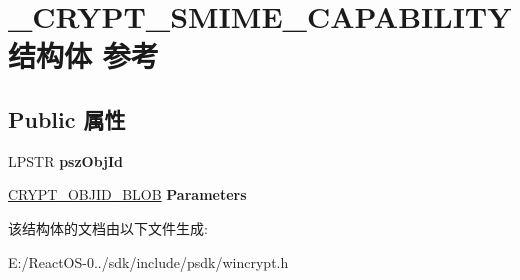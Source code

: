 \hypertarget{struct___c_r_y_p_t___s_m_i_m_e___c_a_p_a_b_i_l_i_t_y}{}\section{\+\_\+\+C\+R\+Y\+P\+T\+\_\+\+S\+M\+I\+M\+E\+\_\+\+C\+A\+P\+A\+B\+I\+L\+I\+T\+Y结构体 参考}
\label{struct___c_r_y_p_t___s_m_i_m_e___c_a_p_a_b_i_l_i_t_y}
\subsection*{Public 属性}
\begin{DoxyCompactItemize}
\item 
\mbox{\label{struct___c_r_y_p_t___s_m_i_m_e___c_a_p_a_b_i_l_i_t_y_a12e669a93b55d6ac4aa81bf216a38460}} 
L\+P\+S\+TR {\bfseries psz\+Obj\+Id}
\item 
\mbox{\label{struct___c_r_y_p_t___s_m_i_m_e___c_a_p_a_b_i_l_i_t_y_ad3b5dd4aa6a5977a5228bca473d5cd1f}} 
\hyperlink{struct___c_r_y_p_t_o_a_p_i___b_l_o_b}{C\+R\+Y\+P\+T\+\_\+\+O\+B\+J\+I\+D\+\_\+\+B\+L\+OB} {\bfseries Parameters}
\end{DoxyCompactItemize}


该结构体的文档由以下文件生成\+:\begin{DoxyCompactItemize}
\item 
E\+:/\+React\+O\+S-\/0../sdk/include/psdk/wincrypt.\+h\end{DoxyCompactItemize}
